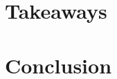 \documentclass{article}
\begin{document}
	\section{Takeaways}
	
	\section{Conclusion}
	
	\newpage
	\nocite{*}
	
\end{document}
